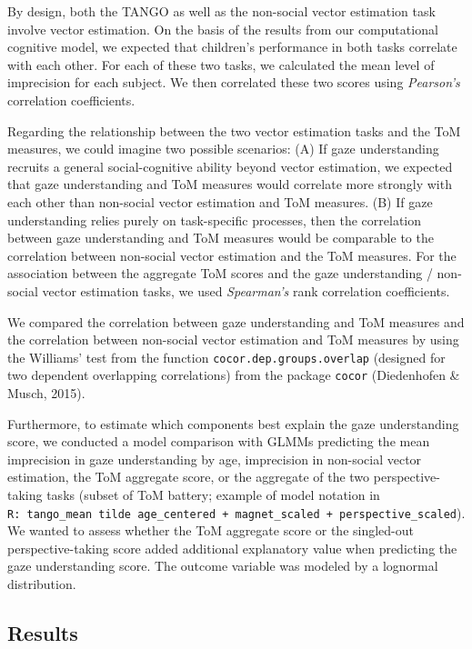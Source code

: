 \documentclass[
  man,mask,floatsintext]{apa6}
\begin{document}
By design, both the TANGO as well as the non-social vector estimation task involve vector estimation. On the basis of the results from our computational cognitive model, we expected that children's performance in both tasks correlate with each other. For each of these two tasks, we calculated the mean level of imprecision for each subject. We then correlated these two scores using \emph{Pearson's} correlation coefficients.

Regarding the relationship between the two vector estimation tasks and the ToM measures, we could imagine two possible scenarios: (A) If gaze understanding recruits a general social-cognitive ability beyond vector estimation, we expected that gaze understanding and ToM measures would correlate more strongly with each other than non-social vector estimation and ToM measures. (B) If gaze understanding relies purely on task-specific processes, then the correlation between gaze understanding and ToM measures would be comparable to the correlation between non-social vector estimation and the ToM measures. For the association between the aggregate ToM scores and the gaze understanding / non-social vector estimation tasks, we used \emph{Spearman's} rank correlation coefficients.

We compared the correlation between gaze understanding and ToM measures and the correlation between non-social vector estimation and ToM measures by using the Williams' test from the function \texttt{cocor.dep.groups.overlap} (designed for two dependent overlapping correlations) from the package \texttt{cocor} (Diedenhofen \& Musch, 2015).

Furthermore, to estimate which components best explain the gaze understanding score, we conducted a model comparison with GLMMs predicting the mean imprecision in gaze understanding by age, imprecision in non-social vector estimation, the ToM aggregate score, or the aggregate of the two perspective-taking tasks (subset of ToM battery; example of model notation in \texttt{R:\ tango\_mean\ tilde\ age\_centered\ +\ magnet\_scaled\ +\ perspective\_scaled}). We wanted to assess whether the ToM aggregate score or the singled-out perspective-taking score added additional explanatory value when predicting the gaze understanding score. The outcome variable was modeled by a lognormal distribution.

\hypertarget{results-2}{%
\subsection{Results}\label{results-2}}
\end{document}

